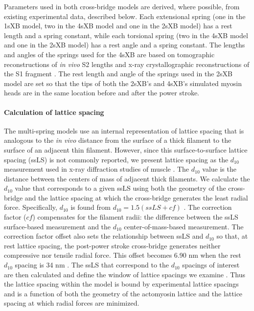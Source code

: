 \documentclass[10pt]{article}
\newcommand{\citep}[1]{\cite{#1}} %
\begin{document}
Parameters used in both cross-bridge models are derived, where possible, from existing experimental data, described below.  
Each extensional spring (one in the 1sXB model, two in the 4sXB model and one in the 2sXB model) has a rest length and a spring constant, while each torsional spring (two in the 4sXB model and one in the 2sXB model) has a rest angle and a spring constant. 
The lengths and angles of the springs used for the 4sXB are based on tomographic reconstructions of \emph{in vivo} S2 lengths and x-ray crystallographic reconstructions of the S1 fragment \citep{Taylor1999, Rayment1993}.
The rest length and angle of the springs used in the 2sXB model are set so that the tips of both the 2sXB's and 4sXB's simulated myosin heads are in the same location before and after the power stroke.




\paragraph{Calculation of lattice spacing} %
The multi-spring models use an internal representation of lattice spacing that is analogous to the \emph{in vivo} distance from the surface of a thick filament to the surface of an adjacent thin filament. 
However, since this surface-to-surface lattice spacing (ssLS) is not commonly reported, we present lattice spacing as the $d_{10}$ measurement used in x-ray diffraction studies of muscle \citep{Millman1998}. 
The $d_{10}$ value is the distance between the centers of mass of adjacent thick filaments. 
We calculate the $d_{10}$ value that corresponds to a given ssLS using both the geometry of the cross-bridge and the lattice spacing at which the cross-bridge generates the least radial force. 
Specifically, $d_{10}$ is found from $d_{10} = 1.5 (ssLS + cf)$ \citep{Millman1998}. 
The correction factor ($cf$) compensates for the filament radii: the difference between the ssLS surface-based measurement and the $d_{10}$ center-of-mass-based measurement.
The correction factor offset also sets the relationship between ssLS and $d_{10}$ so that, at rest lattice spacing, the post-power stroke cross-bridge generates neither compressive nor tensile radial force.  
This offset becomes 6.90 nm when the rest $d_{10}$ spacing is 34 nm \citep{Brenner1991}. 
The ssLS that correspond to the $d_{10}$ spacings of interest are then calculated and define the window of lattice spacings we examine \citep{Millman1998}. 
Thus the lattice spacing within the model is bound by experimental lattice spacings and is a function of both the geometry of the actomyosin lattice and the lattice spacing at which radial forces are minimized. 
\end{document}
